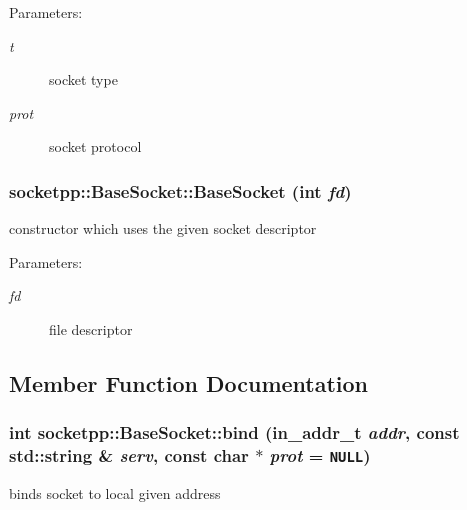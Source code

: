 \begin{Desc}
\item[Parameters:]
\begin{description}
\item[{\em t}]socket type \item[{\em prot}]socket protocol \end{description}
\end{Desc}
\hypertarget{classsocketpp_1_1BaseSocket_f7e18d6700868abb2b476e797506eafb}{
\subsubsection[{BaseSocket}]{\setlength{\rightskip}{0pt plus 5cm}socketpp::BaseSocket::BaseSocket (int {\em fd})}}
\label{classsocketpp_1_1BaseSocket_f7e18d6700868abb2b476e797506eafb}


constructor which uses the given socket descriptor 

\begin{Desc}
\item[Parameters:]
\begin{description}
\item[{\em fd}]file descriptor \end{description}
\end{Desc}


\subsection{Member Function Documentation}
\hypertarget{classsocketpp_1_1BaseSocket_aab800bcb5ee48cd4410ae2b9ed83e23}{
\subsubsection[{bind}]{\setlength{\rightskip}{0pt plus 5cm}int socketpp::BaseSocket::bind (in\_\-addr\_\-t {\em addr}, \/  const std::string \& {\em serv}, \/  const char $\ast$ {\em prot} = {\tt NULL})}}
\label{classsocketpp_1_1BaseSocket_aab800bcb5ee48cd4410ae2b9ed83e23}


binds socket to local given address 


